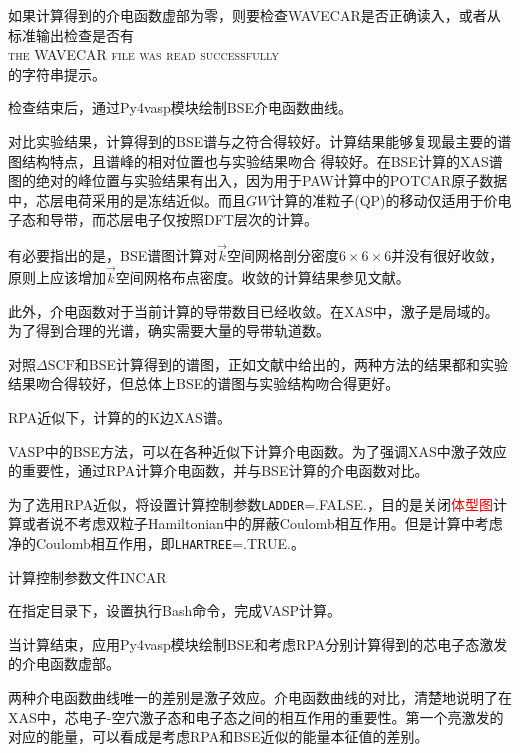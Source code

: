 如果计算得到的介电函数虚部为零，则要检查\textrm{WAVECAR}是否正确读入，或者从标准输出检查是否有\\
\textsc{the WAVECAR file was read successfully} \\
的字符串提示。

检查结束后，通过\textrm{Py4vasp}模块绘制\textrm{BSE}介电函数曲线。

对比实验结果，计算得到的\textrm{BSE}谱与之符合得较好。计算结果能够复现最主要的谱图结构特点，且谱峰的相对位置也与实验结果吻合 得较好。在\textrm{BSE}计算的\textrm{XAS}谱图的绝对的峰位置与实验结果有出入，因为用于\textrm{PAW}计算中的\textrm{POTCAR}原子数据中，芯层电荷采用的是冻结近似。而且$GW$计算的准粒子\textrm{(QP)}的移动仅适用于价电子态和导带，而芯层电子仅按照\textrm{DFT}层次的计算。

有必要指出的是，\textrm{BSE}谱图计算对$\vec k$空间网格剖分密度$6\times6\times6$并没有很好收敛，原则上应该增加$\vec k$空间网格布点密度。收敛的计算结果参见文献\cite{PRB106-155133_2022,PRB79-041192R_2009}。

此外，介电函数对于当前计算的导带数目已经收敛。在\textrm{XAS}中，激子是局域的。为了得到合理的光谱，确实需要大量的导带轨道数。

对照$\Delta\mathrm{SCF}$和\textrm{BSE}计算得到的谱图，正如文献中给出的，两种方法的结果都和实验结果吻合得较好，但总体上\textrm{BSE}的谱图与实验结构吻合得更好。

\textrm{RPA}近似下，计算的的\textrm{K}边\textrm{XAS}谱。

\textrm{VASP}中的\textrm{BSE}方法，可以在各种近似下计算介电函数。为了强调\textrm{XAS}中激子效应的重要性，通过\textrm{RPA}计算介电函数，并与\textrm{BSE}计算的介电函数对比。

为了选用\textrm{RPA}近似，将设置计算控制参数\texttt{LADDER}=\textrm{.FALSE.}，目的是关闭\textcolor{red}{体型图}计算或者说不考虑双粒子\textrm{Hamiltonian}中的屏蔽\textrm{Coulomb}相互作用。但是计算中考虑净的\textrm{Coulomb}相互作用，即\texttt{LHARTREE}=\textrm{.TRUE.}。

计算控制参数文件\textrm{INCAR}

在指定目录下，设置执行\textrm{Bash}命令，完成\textrm{VASP}计算。

当计算结束，应用\textrm{Py4vasp}模块绘制\textrm{BSE}和考虑\textrm{RPA}分别计算得到的芯电子态激发的介电函数虚部。

两种介电函数曲线唯一的差别是激子效应。介电函数曲线的对比，清楚地说明了在\textrm{XAS}中，芯电子-空穴激子态和电子态之间的相互作用的重要性。第一个亮激发的对应的能量，可以看成是考虑\textrm{RPA}和\textrm{BSE}近似的能量本征值的差别。

